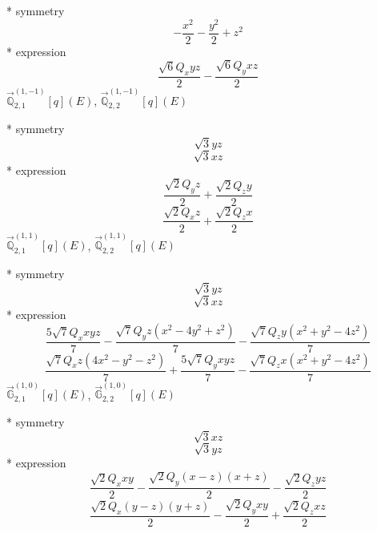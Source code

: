 \documentclass[fleqn,8pt]{jsarticle}
\begin{document}
\noindent\quad ** symmetry
\begin{dmath*}
- \frac{x^{2}}{2} - \frac{y^{2}}{2} + z^{2}
\end{dmath*}
\noindent\quad ** expression
\begin{dmath*}
\frac{\sqrt{6} Q_{x} y z}{2} - \frac{\sqrt{6} Q_{y} x z}{2}
\end{dmath*}
\noindent\quad $\vec{\mathbb{Q}}_{2,1}^{(1,-1)}[q](E)$, $\vec{\mathbb{Q}}_{2,2}^{(1,-1)}[q](E)$

\noindent\quad ** symmetry
\begin{dmath*}
\sqrt{3} y z
\end{dmath*}
\begin{dmath*}
\sqrt{3} x z
\end{dmath*}
\noindent\quad ** expression
\begin{dmath*}
\frac{\sqrt{2} Q_{y} z}{2} + \frac{\sqrt{2} Q_{z} y}{2}
\end{dmath*}
\begin{dmath*}
\frac{\sqrt{2} Q_{x} z}{2} + \frac{\sqrt{2} Q_{z} x}{2}
\end{dmath*}
\noindent\quad $\vec{\mathbb{Q}}_{2,1}^{(1,1)}[q](E)$, $\vec{\mathbb{Q}}_{2,2}^{(1,1)}[q](E)$

\noindent\quad ** symmetry
\begin{dmath*}
\sqrt{3} y z
\end{dmath*}
\begin{dmath*}
\sqrt{3} x z
\end{dmath*}
\noindent\quad ** expression
\begin{dmath*}
\frac{5 \sqrt{7} Q_{x} x y z}{7} - \frac{\sqrt{7} Q_{y} z \left(x^{2} - 4 y^{2} + z^{2}\right)}{7} - \frac{\sqrt{7} Q_{z} y \left(x^{2} + y^{2} - 4 z^{2}\right)}{7}
\end{dmath*}
\begin{dmath*}
\frac{\sqrt{7} Q_{x} z \left(4 x^{2} - y^{2} - z^{2}\right)}{7} + \frac{5 \sqrt{7} Q_{y} x y z}{7} - \frac{\sqrt{7} Q_{z} x \left(x^{2} + y^{2} - 4 z^{2}\right)}{7}
\end{dmath*}
\noindent\quad $\vec{\mathbb{G}}_{2,1}^{(1,0)}[q](E)$, $\vec{\mathbb{G}}_{2,2}^{(1,0)}[q](E)$

\noindent\quad ** symmetry
\begin{dmath*}
\sqrt{3} x z
\end{dmath*}
\begin{dmath*}
\sqrt{3} y z
\end{dmath*}
\noindent\quad ** expression
\begin{dmath*}
\frac{\sqrt{2} Q_{x} x y}{2} - \frac{\sqrt{2} Q_{y} \left(x - z\right) \left(x + z\right)}{2} - \frac{\sqrt{2} Q_{z} y z}{2}
\end{dmath*}
\begin{dmath*}
\frac{\sqrt{2} Q_{x} \left(y - z\right) \left(y + z\right)}{2} - \frac{\sqrt{2} Q_{y} x y}{2} + \frac{\sqrt{2} Q_{z} x z}{2}
\end{dmath*}
\end{document}
